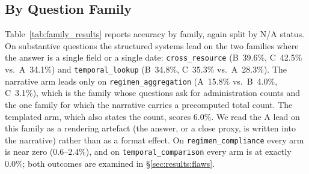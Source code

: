 \subsection{By Question Family}
\label{sec:results:families}

Table~\ref{tab:family_results} reports accuracy by family, again split by N/A status.
On substantive questions the structured systems lead on the two families where the
answer is a single field or a single date: \texttt{cross\_resource} (B~39.6\%, C~42.5\%
vs.\ A~34.1\%) and \texttt{temporal\_lookup} (B~34.8\%, C~35.3\% vs.\ A~28.3\%).  The
narrative arm leads only on \texttt{regimen\_aggregation} (A~15.8\% vs.\ B~4.0\%,
C~3.1\%), which is the family whose questions ask for administration counts and the one
family for which the narrative carries a precomputed total count.  The templated arm,
which also states the count, scores 6.0\%.  We read the A lead on this family as a
rendering artefact (the answer, or a close proxy, is written into the narrative) rather
than as a format effect.  On \texttt{regimen\_compliance} every arm is near zero
(0.6--2.4\%), and on \texttt{temporal\_comparison} every arm is at exactly 0.0\%; both
outcomes are examined in \S\ref{sec:results:flaws}.

